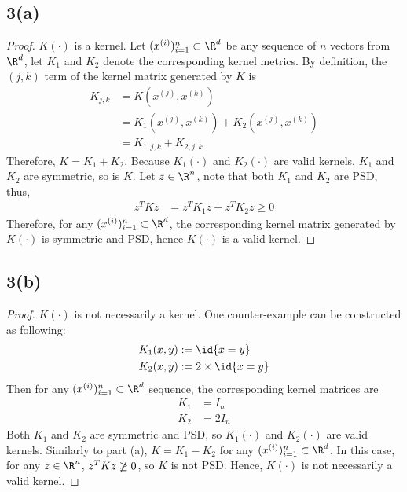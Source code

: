 \documentclass[11pt]{article}
\newcommand{\upi}[0]{^{(i)}}
\begin{document}
	\subsection{3(a)}
	\begin{proof}
		$K(\cdot)$ is a kernel. Let $(x\upi)_{i=1}^n \subset \R^d$ be any sequence of $n$ vectors from $\R^d$, let $K_1$ and $K_2$ denote the corresponding kernel metrics. By definition, the $(j, k)$ term of the kernel matrix generated by $K$ is 
		\begin{align}
			K_{j,k} &= K(x^{(j)}, x^{(k)}) \\
			&= K_1(x^{(j)}, x^{(k)}) + K_2(x^{(j)}, x^{(k)}) \\
			&= K_{1, j, k} + K_{2, j, k}
		\end{align}
		Therefore, $K = K_1 + K_2$. Because $K_1(\cdot)$ and $K_2(\cdot)$ are valid kernels, $K_1$ and $K_2$ are symmetric, so is $K$. Let $z \in \R^n$, note that both $K_1$ and $K_2$ are PSD, thus,
		\begin{align}
			z^T K z &= z^T K_1 z + z^T K_2 z \geq 0
		\end{align}
		Therefore, for any $(x\upi)_{i=1}^n \subset \R^d$, the corresponding kernel matrix generated by $K(\cdot)$ is symmetric and PSD, hence $K(\cdot)$ is a valid kernel.
	\end{proof}
	
	\newpage
	\subsection{3(b)}
	\begin{proof}
		$K(\cdot)$ is not necessarily a kernel. One counter-example can be constructed as following:
		\begin{align}
			K_1(x, y) &:= \id{x = y} \\
			K_2(x, y) &:= 2 \times \id{x = y}
		\end{align}
		Then for any $(x\upi)_{i=1}^n \subset \R^d$ sequence, the corresponding kernel matrices are
		\begin{align}
			K_1 &= I_n \\
			K_2 &= 2 I_n
		\end{align}
		Both $K_1$ and $K_2$ are symmetric and PSD, so $K_1(\cdot)$ and $K_2(\cdot)$ are valid kernels. Similarly to part (a), $K = K_1 - K_2$ for any $(x\upi)_{i=1}^n \subset \R^d$. In this case, for any $z \in \R^n$, $z^T K z \centernot{\geq} 0 $, so $K$ is not PSD. Hence, $K(\cdot)$ is not necessarily a valid kernel.
	\end{proof}
	
\end{document}
